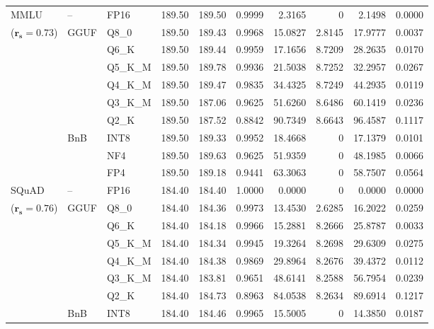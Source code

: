 \begin{longtable}{ll l rrrrrrr}
\midrule
MMLU & -- & FP16 & 189.50 & 189.50 & 0.9999 & 2.3165 & \cellcolor{cyan!12} $0$ & 2.1498 & 0.0000 \\
{\small ($\mathbf{r_s{=}0.73}$)} & GGUF & Q8\_0 & 189.50 & 189.43 & 0.9968 & 15.0827 & 2.8145 & 17.9777 & 0.0037 \\
 &  & Q6\_K & 189.50 & 189.44 & 0.9959 & 17.1656 & 8.7209 & 28.2635 & 0.0170 \\
 &  & Q5\_K\_M & 189.50 & 189.78 & 0.9936 & 21.5038 & 8.7252 & 32.2957 & 0.0267 \\
 &  & Q4\_K\_M & 189.50 & 189.47 & 0.9835 & 34.4325 & 8.7249 & 44.2935 & 0.0119 \\
 &  & Q3\_K\_M & 189.50 & 187.06 & 0.9625 & 51.6260 & 8.6486 & 60.1419 & 0.0236 \\
 &  & Q2\_K & 189.50 & 187.52 & \cellcolor{red!18} 0.8842 & \cellcolor{red!18} 90.7349 & 8.6643 & \cellcolor{red!18} 96.4587 & \cellcolor{red!18} 0.1117 \\
 & BnB & INT8 & 189.50 & 189.33 & 0.9952 & 18.4668 & \cellcolor{cyan!12} $0$ & 17.1379 & 0.0101 \\
 &  & NF4 & 189.50 & 189.63 & 0.9625 & 51.9359 & \cellcolor{cyan!12} $0$ & 48.1985 & 0.0066 \\
 &  & FP4 & 189.50 & 189.18 & \cellcolor{red!18} 0.9441 & \cellcolor{red!18} 63.3063 & \cellcolor{cyan!12} $0$ & \cellcolor{red!18} 58.7507 & \cellcolor{red!18} 0.0564 \\
\midrule
SQuAD & -- & FP16 & 184.40 & 184.40 & 1.0000 & 0.0000 & \cellcolor{cyan!12} $0$ & 0.0000 & 0.0000 \\
{\small ($\mathbf{r_s{=}0.76}$)} & GGUF & Q8\_0 & 184.40 & 184.36 & 0.9973 & 13.4530 & 2.6285 & 16.2022 & 0.0259 \\
 &  & Q6\_K & 184.40 & 184.18 & 0.9966 & 15.2881 & 8.2666 & 25.8787 & 0.0033 \\
 &  & Q5\_K\_M & 184.40 & 184.34 & 0.9945 & 19.3264 & 8.2698 & 29.6309 & 0.0275 \\
 &  & Q4\_K\_M & 184.40 & 184.38 & 0.9869 & 29.8964 & 8.2676 & 39.4372 & 0.0112 \\
 &  & Q3\_K\_M & 184.40 & 183.81 & 0.9651 & 48.6141 & 8.2588 & 56.7954 & 0.0239 \\
 &  & Q2\_K & 184.40 & 184.73 & \cellcolor{red!18} 0.8963 & \cellcolor{red!18} 84.0538 & 8.2634 & \cellcolor{red!18} 89.6914 & \cellcolor{red!18} 0.1217 \\
 & BnB & INT8 & 184.40 & 184.46 & 0.9965 & 15.5005 & \cellcolor{cyan!12} $0$ & 14.3850 & 0.0187 \\

\end{longtable}
